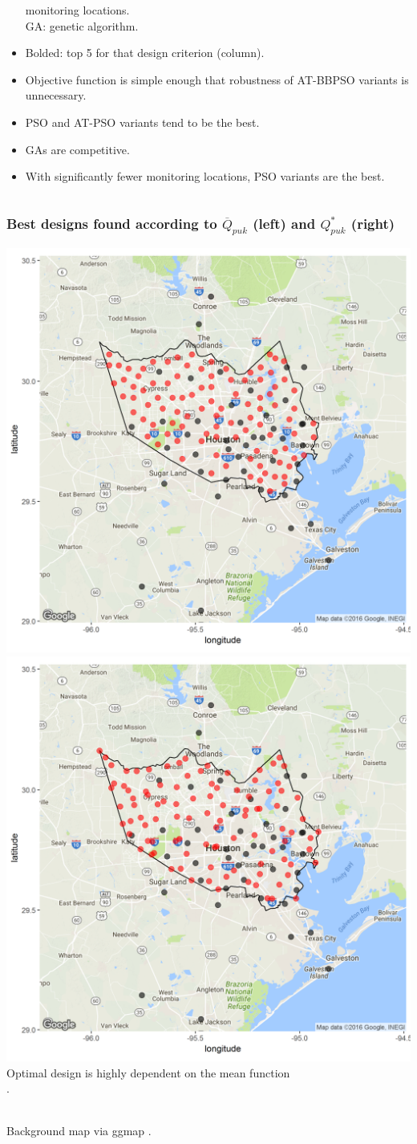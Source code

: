 \documentclass[xcolor=dvipsnames]{beamer}
\begin{document}
\begin{frame}
\begin{columns}
\begin{column}{0.55\textwidth}
\begin{itemize}
\hspace{1.42cm} monitoring locations.\\
GA: genetic algorithm.
\item Bolded: top 5 for that design criterion (column).\pause
\item Objective function is simple enough that robustness of AT-BBPSO variants is unnecessary.\pause
\item PSO and AT-PSO variants tend to be the best.
\item GAs are competitive. \pause
\item With significantly fewer monitoring locations, PSO variants are the best.
  \end{itemize}
\end{column}
\end{columns}
\end{frame}

\begin{frame}
\frametitle{Best designs found according to $\overline{Q}_{puk}$ (left) and $Q^*_{puk}$ (right)}
{\centering
\includegraphics[width=.49\textwidth]{../doc/sig2pukmean.png}
\includegraphics[width=.49\textwidth]{../doc/sig2pukmax.png}
}\\
Optimal design is highly dependent on the mean function\\ \citep{zimmerman2006optimal}.\\~

Background map via ggmap \citep{ggmap2013}.

\end{frame}
\end{document}
